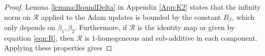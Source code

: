 \documentclass{article}
\begin{document}
\begin{appendices}
\begin{proof}
 Lemma \ref{lemma:BoundDelta} in Appendix \ref{App:K2} states that the infinity norm on $\mathcal R$ applied to the Adam updates is bounded by the constant $B_\beta$, which only depends on $\beta_1,\beta_2$. Furthermore, if $\mathcal R$ is the identity map or given by equation \eqref{eqn:R}, then $\mathcal R$ is $1$-homogeneous and sub-additive in each component. Applying these properties gives

\end{proof}
\end{appendices}
\end{document}

